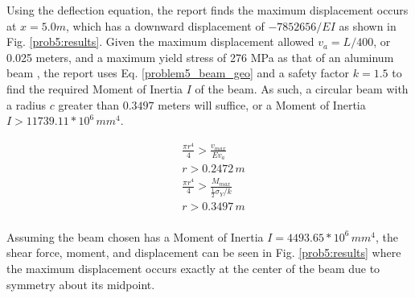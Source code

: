 \documentclass[a4paper]{article}
\begin{document}
Using the deflection equation, the report finds the maximum displacement occurs at $x = 5.0 m$, which has a downward displacement of $-7852656/EI$ as shown in Fig. \ref{prob5:results}. Given the maximum displacement allowed $v_a = L/400$, or 0.025 meters, and a maximum yield stress of 276 MPa as that of an aluminum beam , the report uses Eq. \ref{problem5_beam_geo} and a safety factor $k=1.5$ to find the required Moment of Inertia $I$ of the beam. As such, a circular beam with a radius $c$ greater than $0.3497$ meters will suffice, or a Moment of Inertia $I > 11739.11 * 10^6\,{mm}^4$.

\begin{equation}
\begin{split}
& \frac{\pi r^4}{4} > \frac{v_{max}}{Ev_a} \\
& r > 0.2472\,m \\
& \frac{\pi r^4}{4} > \frac{M_{max}}{\frac{1}{2}\sigma_Y/ k}\\
& r > 0.3497\,m \\
\end{split}
\label{problem5_beam_geo}
\end{equation}

Assuming the beam chosen has a Moment of Inertia $I = 4493.65 * 10^6\,{mm}^4$, the shear force, moment, and displacement can be seen in Fig. \ref{prob5:results} where the maximum displacement occurs exactly at the center of the beam due to symmetry about its midpoint.
\end{document}
